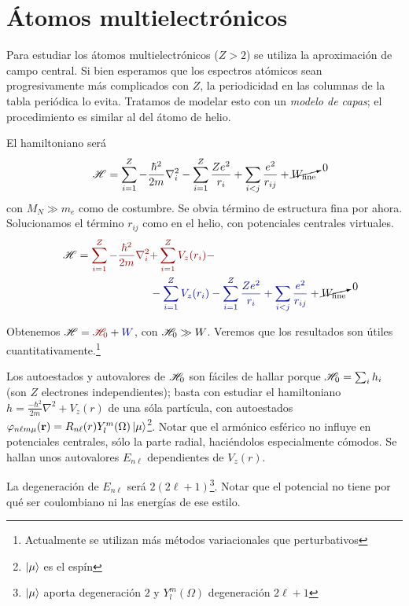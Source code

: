 \chapter{Átomos multielectrónicos}
Para estudiar los átomos multielectrónicos ($Z>2$) se utiliza la
aproximación de campo central. Si bien esperamos que los
espectros atómicos sean progresivamente más complicados con $Z$, la periodicidad en las columnas de la tabla
periódica lo evita. Tratamos de modelar esto con un \emph{modelo de capas}; el
procedimiento es similar al del átomo de helio.

El hamiltoniano será
\begin{equation}
  \mathscr{H} = \sum_{i=1}^Z - \frac{\hbar^2}{2m} \nabla_i^2 - \sum_{i=1}^Z
  \frac{Ze^2}{r_i} + \sum_{i<j} \frac{e^2}{r_{ij}} +
  \cancelto{0}{W_\text{fine}}
\end{equation}
con $M_N \gg m_e$ como de costumbre. Se obvia término de estructura
fina por ahora. Solucionamos el término 
$r_{ij}$ como en el helio, con potenciales centrales virtuales.
\begin{equation}
  \begin{split}
    \Ham = 
    \textcolor{red!60!black}{
\sum_{i=1}^Z - \frac{\hbar^2}{2m} \nabla_i^2
} & 
\textcolor{red!60!black}{
+\sum_{i=1}^Z V_z(r_i)
} -
    \\
    &-
    \textcolor{blue!60!black}{
\sum_{i=1}^Z V_z(r_i) - \sum_{i=1}^Z
    \frac{Ze^2}{r_i} + \sum_{i<j} \frac{e^2}{r_{ij}}
    }
 +
    \cancelto{0}{W_\text{fine}}
  \end{split}
\end{equation}

Obtenemos $\Ham = \textcolor{red!60!black}{\Ham_0} + \textcolor{blue!60!black}{W}$, con $\mathscr{H}_0 \gg W$. Veremos que los
resultados son útiles cuantitativamente.\footnote{Actualmente se
  utilizan más métodos variacionales que perturbativos}

Los autoestados y autovalores de $\mathscr{H}_0$ 
son fáciles de hallar porque $\mathscr{H}_0 = \sum_{i}h_i$ (son $Z$
electrones independientes); basta con estudiar el hamiltoniano $h =
\frac{-\hbar^2}{2m} \nabla^2 + V_z(r)$ de una
sóla partícula, con
autoestados $\varphi_{n\ell m
  \mu}(\bm{\mathrm{r}})=R_{n\ell}(r)Y_l^m(\Omega)\ket{\mu}$\footnote{$\ket{\mu}$ es
  el espín}.
Notar que el armónico esférico no influye en potenciales
centrales, sólo la parte radial, haciéndolos especialmente
cómodos. 
Se hallan unos autovalores $E_{n\ell}$
dependientes de $V_z(r)$.

La degeneración de $E_{n\ell}$ será $2(2\ell+1)$\footnote{$\ket{\mu}$
  aporta degeneración $2$ 
  y $Y_l^m(\Omega)$ degeneración $2\ell+1$}. 
Notar que el potencial no tiene
por qué ser coulombiano ni las energías de ese
estilo.

